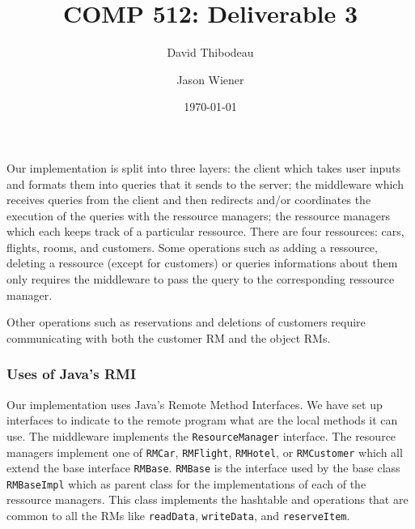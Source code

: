 \documentclass[12pt]{article}
\author{David Thibodeau \and Jason Wiener}
\title{COMP 512: Deliverable 3}
\date{\today}
\theoremstyle{plain}%
\theoremstyle{definition}
\theoremstyle{remark}
\newcommand{\java}[1]{{\lstinline!#1!}}
\begin{document}
\maketitle


Our implementation is split into three layers: the client which takes
user inputs and formats them into queries that it sends to the server;
the middleware which receives queries from the client and then redirects and/or
coordinates the execution of the queries with the ressource managers;
the ressource managers which each keeps track of a particular
ressource. There are four ressources: cars, flights, rooms, and
customers. Some operations such as adding a ressource, deleting a
ressource (except for customers) or queries informations about them
only requires the middleware to pass the query to the corresponding
ressource manager. 

Other operations such as reservations and deletions
of customers require communicating with both the
customer RM and the object RMs.

\subsubsection*{Uses of Java's RMI}

Our implementation uses Java's Remote Method Interfaces. We have set up
 interfaces to indicate to the remote
program what are the local methods it can use. The middleware
implements the \java{ResourceManager} interface. The resource managers
implement one of \java{RMCar}, \java{RMFlight}, \java{RMHotel}, or
\java{RMCustomer} which all extend the base interface \java{RMBase}.
\java{RMBase} is the interface used by the base class
\java{RMBaseImpl} which as parent class for the implementations of
each of the ressource managers. This class implements the hashtable
and operations that are common to all the RMs like \java{readData},
\java{writeData}, and \java{reserveItem}.
\end{document}
